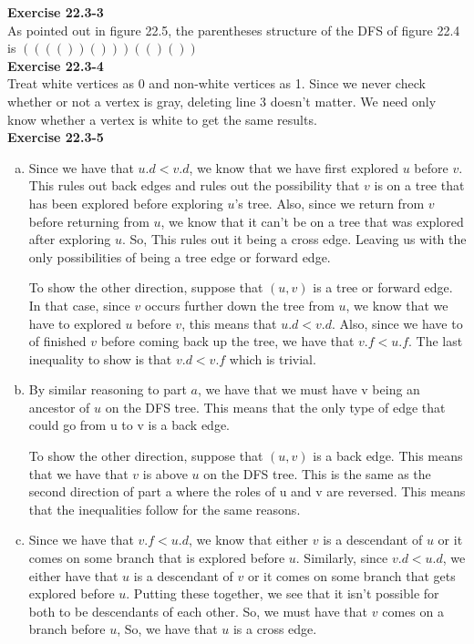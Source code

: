 \documentclass{article}
\begin{document}
\noindent\textbf{Exercise 22.3-3}\\

As pointed out in figure 22.5, the parentheses structure of the DFS of figure 22.4 is $(((())()))(()())$\\

\noindent\textbf{Exercise 22.3-4}\\

Treat white vertices as 0 and non-white vertices as 1.  Since we never check whether or not a vertex is gray, deleting line 3 doesn't matter.  We need only know whether a vertex is white to get the same results. \\

\noindent\textbf{Exercise 22.3-5}\\

\begin{enumerate}[a.]
\item
Since we have that $u.d < v.d$, we know that we have first explored $u$ before $v$. This rules out back edges and rules out the possibility that $v$ is on a tree that has been explored before exploring $u$'s tree. Also, since we return from $v$ before returning from $u$, we know that it can't be on a tree that was explored after exploring $u$. So, This rules out it being a cross edge. Leaving us with the only possibilities of being a tree edge or forward edge.

To show the other direction, suppose that $(u,v)$ is a tree or forward edge. In that case, since $v$ occurs further down the tree from $u$, we know that we have to explored $u$ before $v$, this means that $u.d< v.d$. Also, since we have to of finished $v$ before coming back up the tree, we have that $v.f<u.f$. The last inequality to show is that $v.d < v.f$ which is trivial.
\item
By similar reasoning to part $a$, we have that we must have v being an ancestor of $u$ on the DFS tree. This means that the only type of edge that could go from u to v is a back edge.

To show the other direction, suppose that $(u,v)$ is a back edge. This means that we have that $v$ is above $u$ on the DFS tree. This is the same as the second direction of part a where the roles of u and v are reversed. This means that the inequalities follow for the same reasons.


\item
Since we have that $v.f < u.d$, we know that either $v$ is a descendant of $u$ or it comes on some branch that is explored before $u$. Similarly, since $v.d < u.d$, we either have that $u$ is a descendant of $v$ or it comes on some branch that gets explored before $u$. Putting these together, we see that it isn't possible for both to be descendants of each other. So, we must have that $v$ comes on a branch before $u$, So, we have that $u$ is a cross edge.


\end{enumerate}
\end{document}
